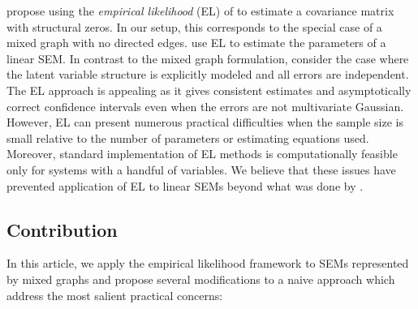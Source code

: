 \documentclass[notitlepage]{article}
\begin{document}
 \citet{chaudhuri2007estimation} propose using the \emph{empirical
   likelihood} (EL) of \cite{owen2001empirical} to estimate a
 covariance matrix with structural zeros.  In our setup, this
 corresponds to the special case of a mixed graph with no directed
 edges.  \citet{kolenikov2009empirical} use EL to estimate the
 parameters of a linear SEM.  In contrast to the mixed graph
 formulation, \citet{kolenikov2009empirical} consider the case where
 the latent variable structure is explicitly modeled and all errors
 are independent.  The EL approach is appealing as it gives consistent
 estimates and asymptotically correct confidence intervals even when
 the errors are not multivariate Gaussian. However, EL can present
 numerous practical difficulties when the sample size is small
 relative to the number of parameters or estimating equations used.
 Moreover, standard implementation of EL methods is computationally
 feasible only for systems with a handful of variables.  We believe
 that these issues have prevented application of EL to linear SEMs
 beyond what was done by \citet{kolenikov2009empirical}.



\subsection{Contribution}

In this article, we apply the empirical likelihood framework to SEMs
represented by mixed graphs and propose several modifications to a
naive approach which address the most salient practical
concerns:
\end{document}
